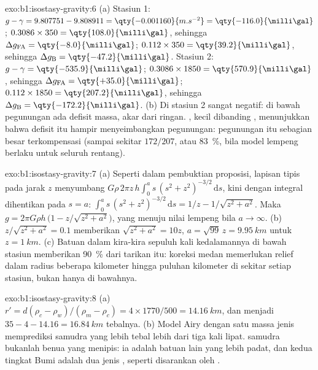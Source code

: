 \begin{solution}{exo:b1:isostasy-gravity:6}
(a) Stasiun 1: $g - \gamma = 9.807751 - 9.808911 = \qty{-0.001160}{m.s^{-2}} =
\qty{-116.0}{\milli\gal}$;  $0.3086\times350 =
\qty{108.0}{\milli\gal}$, sehingga $\Delta g_{\mathrm{FA}} = \qty{-8.0}{\milli\gal}$;
 $0.112\times350 = \qty{39.2}{\milli\gal}$, sehingga
$\Delta g_{\mathrm B} = \qty{-47.2}{\milli\gal}$.
Stasiun 2: $g - \gamma = \qty{-535.9}{\milli\gal}$; 
$0.3086\times1850 = \qty{570.9}{\milli\gal}$, sehingga $\Delta g_{\mathrm{FA}} =
\qty{+35.0}{\milli\gal}$;  $0.112\times1850 =
\qty{207.2}{\milli\gal}$, sehingga $\Delta g_{\mathrm B} = \qty{-172.2}{\milli\gal}$.
(b) Di stasiun 2  sangat negatif: di bawah pegunungan ada defisit
massa, akar dari  ringan. , kecil dibanding ,
menunjukkan bahwa defisit itu hampir menyeimbangkan pegunungan: pegunungan itu sebagian besar terkompensasi
(sampai sekitar $172/207$, atau \qty{83}{\percent}, bila model lempeng berlaku untuk seluruh
rentang).
\end{solution}

\begin{solution}{exo:b1:isostasy-gravity:7}
(a) Seperti dalam pembuktian proposisi, lapisan tipis pada jarak $z$
menyumbang $G\rho\,2\pi z\,h\int_0^a s\,(s^2 + z^2)^{-3/2}\,\mathrm ds$, kini
dengan integral dihentikan pada $s = a$:
$\int_0^a s\,(s^2 + z^2)^{-3/2}\,\mathrm ds = 1/z - 1/\sqrt{z^2 + a^2}$. Maka
$g = 2\pi G\rho h\,\bigl(1 - z/\sqrt{z^2 + a^2}\bigr)$, yang menuju nilai lempeng
bila $a \to \infty$. (b) $z/\sqrt{z^2 + a^2} = 0.1$ memberikan
$\sqrt{z^2 + a^2} = 10z$, $a = \sqrt{99}\,z = \qty{9.95}{km}$ untuk
$z = \qty{1}{km}$. (c) Batuan dalam kira-kira sepuluh kali kedalamannya di bawah
stasiun memberikan \qty{90}{\percent} dari tarikan itu: koreksi medan
memerlukan relief dalam radius beberapa kilometer hingga puluhan kilometer di sekitar setiap stasiun, bukan hanya di bawahnya.
\end{solution}

\begin{solution}{exo:b1:isostasy-gravity:8}
(a) $r' = d(\rho_c - \rho_w)/(\rho_m - \rho_c) = 4\times1770/500 =
\qty{14.16}{km}$, dan  menjadi $35 - 4 - 14.16 = \qty{16.84}{km}$ tebalnya.
(b) Model Airy dengan satu massa jenis  memprediksi  samudra yang lebih
tebal lebih dari tiga kali lipat.  samudra bukanlah  benua yang menipis: ia adalah batuan lain yang lebih padat, dan kedua tingkat Bumi adalah dua jenis ,
seperti disarankan oleh .
\end{solution}

